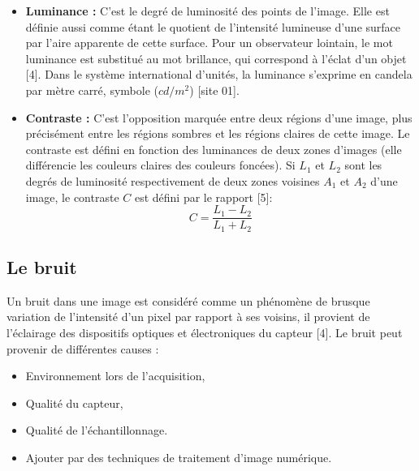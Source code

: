 \begin{itemize}
	\item \textbf{Luminance :}
	C’est le degré de luminosité des points de l’image. Elle est définie aussi comme étant le quotient de l’intensité lumineuse d’une surface par l’aire apparente de cette surface. Pour un observateur lointain, le mot luminance est substitué au mot brillance, qui correspond à l’éclat d’un objet [4].
	Dans le système international d'unités, la luminance s'exprime en candela
	par mètre carré, symbole ($cd/m^2$) [site 01].
	
	\item \textbf{Contraste :}
	C’est l’opposition marquée entre deux régions d’une image, plus
	précisément entre les régions sombres et les régions claires de cette image.
	Le contraste est défini en fonction des luminances de deux zones d’images
	(elle différencie les couleurs claires des couleurs foncées).
	Si $ L_1 $ et $ L_2 $ sont les degrés de luminosité respectivement de deux zones voisines $ A_1 $ et $ A_2 $ d’une image, le contraste $ C $ est défini par le rapport [5]:
	\begin{equation}
		 C = \frac{L_1 - L_2}{L_1 + L_2} 
	\end{equation}
\end{itemize}
 

 

\subsection{Le bruit}
Un bruit dans une image est considéré comme un phénomène de brusque
variation de l’intensité d’un pixel par rapport à ses voisins, il provient de
l’éclairage des dispositifs optiques et électroniques du capteur [4].
Le bruit peut provenir de différentes causes :
\begin{itemize}
	\item Environnement lors de l'acquisition,
	\item Qualité du capteur,
	\item Qualité de l'échantillonnage.
	\item Ajouter par des techniques de traitement d'image numérique.
\end{itemize}


 
